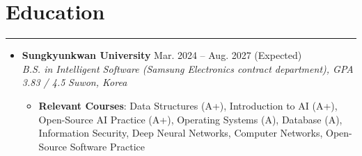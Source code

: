 \documentclass[letterpaper, 10pt]{article}
\begin{document}
\section*{Education}
\hrule
\vspace{4pt}
\begin{itemize}
   \item[]
       \textbf{Sungkyunkwan University} \hfill Mar. 2024 -- Aug. 2027 (Expected) \\
       \textit{B.S. in Intelligent Software (Samsung Electronics contract department), GPA 3.83 / 4.5} \hfill \textit{Suwon, Korea}
       \begin{itemize}
           \item \textbf{Relevant Courses}: Data Structures (A+), Introduction to AI (A+), Open-Source AI Practice (A+), Operating Systems (A), Database (A), Information Security, Deep Neural Networks, Computer Networks, Open-Source Software Practice
       \end{itemize}
\end{itemize}

\end{document}
